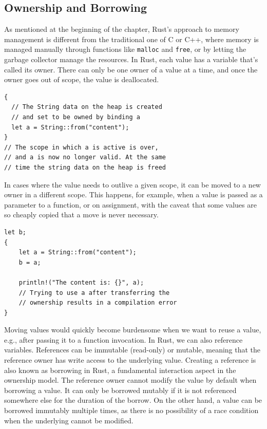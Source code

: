 \documentclass[paper=a4,%
  twoside,%
  BCOR4mm,%
  abstract=true,%
  toc=bibliography,%
  chapterprefix=true,%
  toc=bibliographynumbered,%
  open=right,%
  english,%
  pagesize=pdftex]{scrreprt}
\begin{document}
\subsection{Ownership and Borrowing}
As mentioned at the beginning of the chapter, Rust's approach to memory management is different from the traditional one of C or C++, where memory is managed manually through functions like \texttt{malloc} and \texttt{free}, or by letting the garbage collector manage the resources. In Rust, each value has a variable that's called its owner. There can only be one owner of a value at a time, and once the owner goes out of scope, the value is deallocated.

\begin{lstlisting}[style=boxed, caption=Heap data owned by binding, label=lst:example-ownership]
{
  // The String data on the heap is created
  // and set to be owned by binding a
  let a = String::from("content");
}
// The scope in which a is active is over,
// and a is now no longer valid. At the same
// time the string data on the heap is freed
\end{lstlisting}

In cases where the value needs to outlive a given scope, it can be moved to a new owner in a different scope. This happens, for example, when a value is passed as a parameter to a function, or on assignment, with the caveat that some values are so cheaply copied that a move is never necessary.

\begin{lstlisting}[style=boxed, caption=Transferring Ownership, label=lst:transfer-ownership]
let b;
{
    let a = String::from("content");
    b = a;

    println!("The content is: {}", a);
    // Trying to use a after transferring the
    // ownership results in a compilation error
}
\end{lstlisting}

Moving values would quickly become burdensome when we want to reuse a value, e.g., after passing it to a function invocation. In Rust, we can also reference variables. References can be immutable (read-only) or mutable, meaning that the reference owner has write access to the underlying value. Creating a reference is also known as borrowing in Rust, a fundamental interaction aspect in the ownership model. The reference owner cannot modify the value by default when borrowing a value. It can only be borrowed mutably if it is not referenced somewhere else for the duration of the borrow. On the other hand, a value can be borrowed immutably multiple times, as there is no possibility of a race condition when the underlying cannot be modified. 
\end{document}
